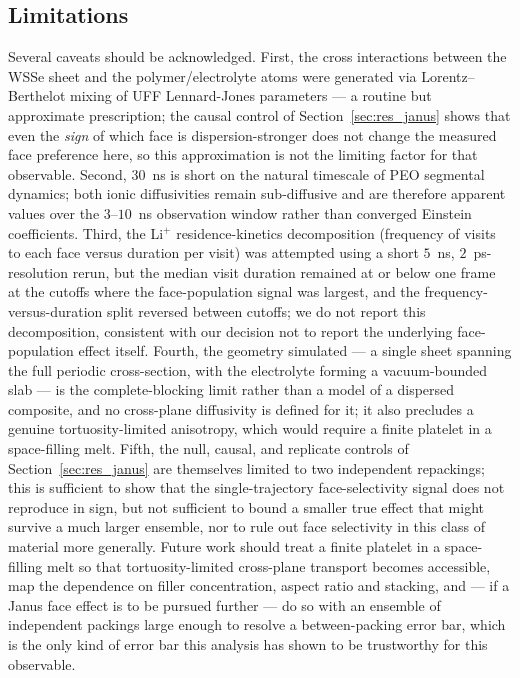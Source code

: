 \documentclass[review, 12pt]{elsarticle}
\numberwithin{equation}{section}
\newcommand{\sect}[1] {Section~\ref{#1}}
\newcommand{\WSSe}{WSSe\xspace}
\begin{document}
\subsection{Limitations}\label{sec:lim}
Several caveats should be acknowledged. First, the cross interactions between the \WSSe sheet and the polymer/electrolyte atoms were generated via Lorentz--Berthelot mixing of UFF Lennard-Jones parameters --- a routine but approximate prescription; the causal control of \sect{sec:res_janus} shows that even the \emph{sign} of which face is dispersion-stronger does not change the measured face preference here, so this approximation is not the limiting factor for that observable. Second, $30$~ns is short on the natural timescale of PEO segmental dynamics; both ionic diffusivities remain sub-diffusive and are therefore apparent values over the $3$--$10$~ns observation window rather than converged Einstein coefficients. Third, the Li$^+$ residence-kinetics decomposition (frequency of visits to each face versus duration per visit) was attempted using a short $5$~ns, $2$~ps-resolution rerun, but the median visit duration remained at or below one frame at the cutoffs where the face-population signal was largest, and the frequency-versus-duration split reversed between cutoffs; we do not report this decomposition, consistent with our decision not to report the underlying face-population effect itself. Fourth, the geometry simulated --- a single sheet spanning the full periodic cross-section, with the electrolyte forming a vacuum-bounded slab --- is the complete-blocking limit rather than a model of a dispersed composite, and no cross-plane diffusivity is defined for it; it also precludes a genuine tortuosity-limited anisotropy, which would require a finite platelet in a space-filling melt. Fifth, the null, causal, and replicate controls of \sect{sec:res_janus} are themselves limited to two independent repackings; this is sufficient to show that the single-trajectory face-selectivity signal does not reproduce in sign, but not sufficient to bound a smaller true effect that might survive a much larger ensemble, nor to rule out face selectivity in this class of material more generally. Future work should treat a finite platelet in a space-filling melt so that tortuosity-limited cross-plane transport becomes accessible, map the dependence on filler concentration, aspect ratio and stacking, and --- if a Janus face effect is to be pursued further --- do so with an ensemble of independent packings large enough to resolve a between-packing error bar, which is the only kind of error bar this analysis has shown to be trustworthy for this observable.
\end{document}
